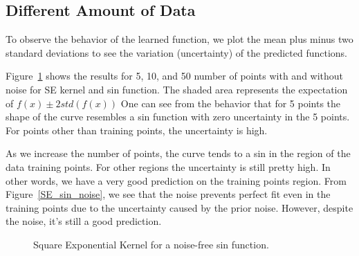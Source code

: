 \documentclass[]{IEEEtran}
\begin{document}
\subsection{Different Amount of Data}
To observe the behavior of the learned function, we plot the mean plus minus two standard deviations to see the variation (uncertainty) of the predicted functions.\par 
Figure~\ref{SE_sin} shows the results for 5, 10, and 50 number of points with and without noise for SE kernel and sin function. The shaded area represents the expectation of \(f(x)\pm 2std(f(x))\) One can see from the behavior that for 5 points the shape of the curve resembles a sin function with zero uncertainty in the 5 points. For points other than training points, the uncertainty is high. \par
As we increase the number of points, the curve tends to a sin in the region of the data training points. For other regions the uncertainty is still pretty high. In other words, we have a very good prediction on the training points region. From Figure~\ref{SE_sin_noise}, we see that the noise prevents perfect fit even in the training points due to the uncertainty caused by the prior noise. However, despite the noise, it's still a good prediction.  

\begin{figure}[h]
  \centering
  \hspace{1mm}
  \hspace{1mm}
  \hspace{1mm}
  
  \caption{Square Exponential Kernel for a noise-free sin function.}
  \label{SE_sin}
\end{figure}\par
  
\end{document}
